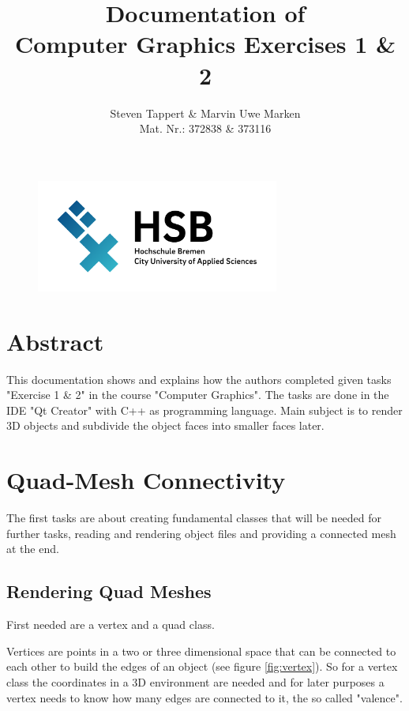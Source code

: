 \documentclass[11.5pt,oneside,a4paper]{scrartcl}
\title{Documentation of\\Computer Graphics Exercises 1 \& 2}
\author{Steven Tappert \& Marvin Uwe Marken\\\small{Mat. Nr.: 372838 \& 373116}}
\date{}
\newcounter{ct}
\begin{document}
\clearpage
{\let\newpage\relax\maketitle}
\thispagestyle{empty}
\vspace{20pt}

\begin{figure}
	\centering
	\includegraphics[width=8cm]{hsb.png} \\
\end{figure}

\newpage
\tableofcontents
\newpage

\section{Abstract}
This documentation shows and explains how the authors completed given tasks "Exercise 1 \& 2" in the course "Computer Graphics". The tasks are done in the IDE "Qt Creator" with C++ as programming language. Main subject is to render 3D objects and subdivide the object faces into smaller faces later.

\section{Quad-Mesh Connectivity}

The first tasks are about creating fundamental classes that will be needed for further tasks, reading and rendering object files and providing a connected mesh at the end.


\subsection{Rendering Quad Meshes}

First needed are a vertex and a quad class.

Vertices are points in a two or three dimensional space that can be connected to each other to build the edges of an object (see figure \ref{fig:vertex}). So for a vertex class the coordinates in a 3D environment are needed and for later purposes a vertex needs to know how many edges are connected to it, the so called "valence".
\end{document}
